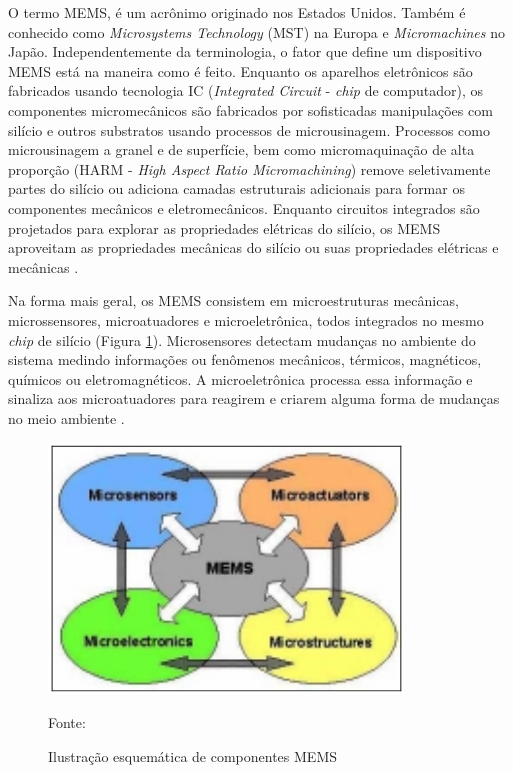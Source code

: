 		O termo MEMS, é um acrônimo originado nos Estados Unidos. Também é conhecido como \textit{Microsystems Technology} (MST) na Europa e \textit{Micromachines} no Japão. Independentemente da terminologia, o fator que define um dispositivo MEMS está na maneira como é feito. Enquanto os aparelhos eletrônicos são fabricados usando tecnologia IC (\textit{Integrated Circuit} - \textit{chip} de computador), os componentes micromecânicos são fabricados por sofisticadas manipulações com silício e outros substratos usando processos de microusinagem. Processos como microusinagem a granel e de superfície, bem como micromaquinação de alta proporção (HARM - \textit{High Aspect Ratio Micromachining}) remove seletivamente partes do silício ou adiciona camadas estruturais adicionais para formar os componentes mecânicos e eletromecânicos. Enquanto circuitos integrados são projetados para explorar as propriedades elétricas do silício, os MEMS aproveitam as propriedades mecânicas do silício ou suas propriedades elétricas e mecânicas \cite{prime2002}.

		Na forma mais geral, os MEMS consistem em microestruturas mecânicas, microssensores, microatuadores e microeletrônica, todos integrados no mesmo \textit{chip} de silício (Figura \ref{esquematico_mems}). Microsensores detectam mudanças no ambiente do sistema medindo informações ou fenômenos mecânicos, térmicos, magnéticos, químicos ou eletromagnéticos. A microeletrônica processa essa informação e sinaliza aos microatuadores para reagirem e criarem alguma forma de mudanças no meio ambiente \cite{prime2002}.

		\begin{figure}[h]
			\centering
			\includegraphics[keepaspectratio=true,scale=0.7
			]{figuras/esquematico_mems.png}
			\caption{Ilustração esquemática de componentes MEMS}
			Fonte: \cite{prime2002}
			\label{esquematico_mems}
		\end{figure}

